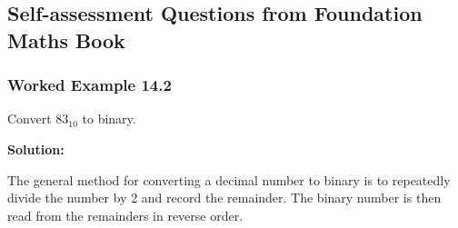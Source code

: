 \documentclass{article}
\begin{document}
\noindent{}


\newpage

\subsection*{Self-assessment Questions from Foundation Maths Book}
\subsubsection*{Worked Example 14.2} Convert $83_{10}$ to binary.

\vspace*{0.5cm}

\noindent \textbf{Solution:}

\vspace*{0.25cm}

\noindent The general method for converting a decimal number to binary is to repeatedly divide the number by 2 and record the remainder. 
The binary number is then read from the remainders in reverse order.

\vspace*{0.25cm}
\end{document}
